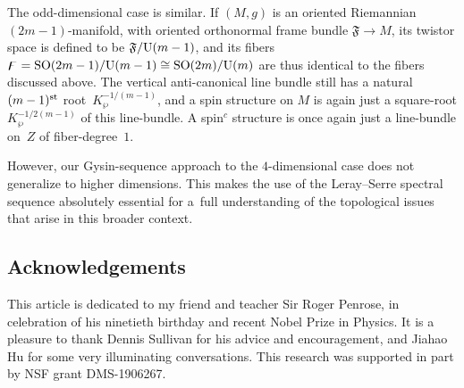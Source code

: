 \documentclass[10pt,a4paper]{amsart}
\numberwithin{equation}{section}
\begin{document}
The odd-dimensional case is similar. If $(M,g)$ is an oriented Riemannian $(2m-1)$-manifold, with oriented orthonormal
frame bundle $\mathfrak{F}\to M$, its twistor space is defined to be $\mathfrak{F}/{\rm U}(m-1)$, and its fibers ${\digamma}= {\rm SO}(2m-1)/{\rm U}(m-1)\cong {\rm SO}(2m)/{\rm U}(m)$ are thus
identical to the fibers discussed above. The vertical anti-canonical line bundle still has a natural $(m-1)^{\rm st}$ root~$K^{-1/(m-1)}_\wp$, and a spin structure on $M$ is again just a square-root $K^{-1/2(m-1)}_\wp$ of this line-bundle.
A spin$^c$ structure is once again just
a line-bundle on~$Z$ of fiber-degree~$1$.

However, our Gysin-sequence approach to the $4$-dimensional case does not generalize to higher dimensions. This makes the use of the Leray--Serre spectral sequence absolutely essential for a~full understanding of the topological issues that arise in this broader context.

\vspace{-1mm}

\subsection*{Acknowledgements}
 This article is dedicated to my friend and teacher Sir Roger Penrose, in celebration of
his ninetieth birthday and recent Nobel Prize in Physics.
It is a pleasure to thank Dennis Sullivan for
his advice and encouragement, and Jiahao Hu for some very illuminating conversations. This research was supported in part by NSF grant DMS-1906267.

\vspace{-1mm}

\end{document}
